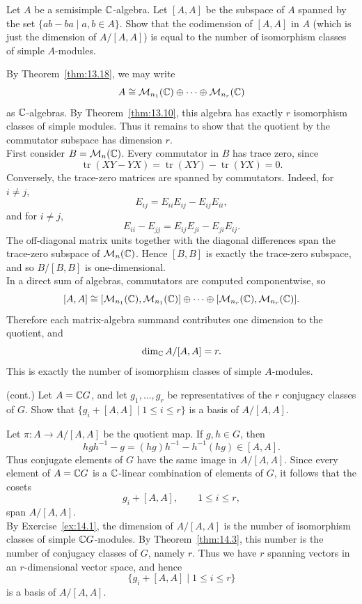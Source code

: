 \documentclass[../Odyssey_Project.tex]{subfiles}
\begin{document}
\begin{exercise}
\label{ex:14.1}
Let $A$ be a semisimple $\mathbb{C}$-algebra. Let $[A, A]$ be the subspace of $A$ spanned by the set $\{ab - ba \mid a, b \in A\}$. Show that the codimension of $[A, A]$ in $A$ (which is just the dimension of $A/[A, A]$) is equal to the number of isomorphism classes of simple $A$-modules.
\end{exercise}
\begin{solution}
    By Theorem~\ref{thm:13.18}, we may write
    \[
        A\cong \mathcal{M}_{n_1}(\mathbb{C})\oplus\cdots\oplus \mathcal{M}_{n_r}(\mathbb{C})
    \]
    as $\mathbb{C}$-algebras. By Theorem~\ref{thm:13.10}, this algebra has exactly $r$ isomorphism classes of simple modules. Thus it remains to show that the quotient by the commutator subspace has dimension $r$.\\
    First consider $B=\mathcal{M}_n(\mathbb{C})$. Every commutator in $B$ has trace zero, since
    \[
        \operatorname{tr}(XY-YX)=\operatorname{tr}(XY)-\operatorname{tr}(YX)=0.
    \]
    Conversely, the trace-zero matrices are spanned by commutators. Indeed, for $i\neq j$,
    \[
        E_{ij}=E_{ii}E_{ij}-E_{ij}E_{ii},
    \]
    and for $i\neq j$,
    \[
        E_{ii}-E_{jj}=E_{ij}E_{ji}-E_{ji}E_{ij}.
    \]
    The off-diagonal matrix units together with the diagonal differences span the trace-zero subspace of $\mathcal{M}_n(\mathbb{C})$. Hence $[B,B]$ is exactly the trace-zero subspace, and so $B/[B,B]$ is one-dimensional.\\
    In a direct sum of algebras, commutators are computed componentwise, so
    \[
        [A,A]\cong [\mathcal{M}_{n_1}(\mathbb{C}),\mathcal{M}_{n_1}(\mathbb{C})]\oplus\cdots\oplus [\mathcal{M}_{n_r}(\mathbb{C}),\mathcal{M}_{n_r}(\mathbb{C})].
    \]
    Therefore each matrix-algebra summand contributes one dimension to the quotient, and
    \[
        \dim_{\mathbb{C}}A/[A,A]=r.
    \]
    This is exactly the number of isomorphism classes of simple $A$-modules.
\end{solution}

\begin{exercise}
\label{ex:14.2}
(cont.) Let $A = \mathbb{C} G$, and let $g_1, \ldots, g_r$ be representatives of the $r$ conjugacy classes of $G$. Show that $\{g_i + [A, A] \mid 1 \leq i \leq r\}$ is a basis of $A/[A, A]$.
\end{exercise}
\begin{solution}
    Let $\pi \colon A\to A/[A,A]$ be the quotient map. If $g,h\in G$, then
    \[
        hgh^{-1}-g=(hg)h^{-1}-h^{-1}(hg)\in [A,A].
    \]
    Thus conjugate elements of $G$ have the same image in $A/[A,A]$. Since every element of $A=\mathbb{C} G$ is a $\mathbb{C}$-linear combination of elements of $G$, it follows that the cosets
    \[
        g_i+[A,A],\qquad 1\leq i\leq r,
    \]
    span $A/[A,A]$.\\
    By Exercise~\ref{ex:14.1}, the dimension of $A/[A,A]$ is the number of isomorphism classes of simple $\mathbb{C} G$-modules. By Theorem~\ref{thm:14.3}, this number is the number of conjugacy classes of $G$, namely $r$. Thus we have $r$ spanning vectors in an $r$-dimensional vector space, and hence
    \[
        \{g_i+[A,A]\mid 1\leq i\leq r\}
    \]
    is a basis of $A/[A,A]$.
\end{solution}
\end{document}
